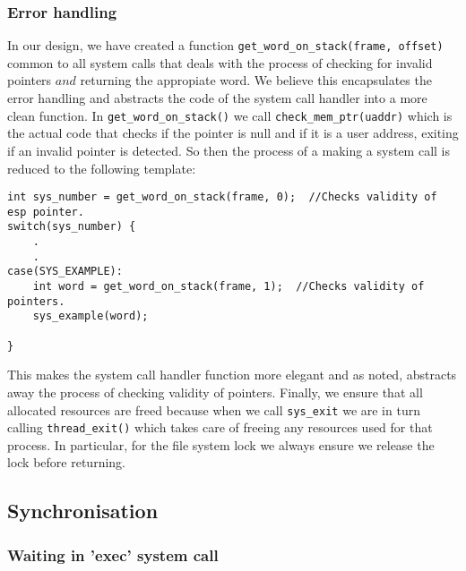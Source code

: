 \documentclass{article}
\renewcommand{\_}{\char`_}
\begin{document}
\subsubsection{Error handling}

In our design, we have created a function  \lstinline{get_word_on_stack(frame, offset)} common to all system calls that deals with the process of checking for invalid pointers $and$ returning the appropiate word. We believe this encapsulates the error handling and abstracts the code of the system call handler into a more clean function. In \lstinline{get_word_on_stack()} we call \lstinline{check_mem_ptr(uaddr)} which is the actual code that checks if the pointer is null and if it is a user address, exiting if an invalid pointer is detected. So then the process of a making a system call is reduced to the following template:

\begin{lstlisting}
int sys_number = get_word_on_stack(frame, 0);  //Checks validity of esp pointer.
switch(sys_number) {
	.
	.
case(SYS_EXAMPLE):
	int word = get_word_on_stack(frame, 1);  //Checks validity of pointers.
	sys_example(word);

}
\end{lstlisting}

This makes the system call handler function more elegant and as noted, abstracts away the process of checking validity of pointers. Finally, we ensure that all allocated resources are freed because when we call \lstinline{sys_exit} we are in turn calling \lstinline{thread_exit()} which takes care of freeing any resources used for that process. In particular, for the file system lock we always ensure we release the lock before returning.

\subsection{Synchronisation}

\subsubsection{Waiting in 'exec' system call}
\end{document}
